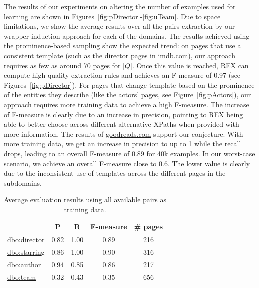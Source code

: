 \documentclass{llncs}
\begin{document}
The results of our experiments on altering the number of examples used for learning are shown in Figures~\ref{fig:pDirector}-\ref{fig:uTeam}. 
Due to space limitations, we show the average results over all the pairs extraction by our wrapper induction approach for each of the domains.
The results achieved using the prominence-based sampling show the expected trend: on pages that use a consistent template (such as the director pages in \url{imdb.com}), our approach requires as few as around 70 pages for $|Q|$. 
Once this value is reached, REX can compute high-quality extraction rules and achieves an F-measure of 0.97 (see Figures~\ref{fig:pDirector}).
For pages that change template based on the prominence of the entities they describe (like the actors' pages, see Figure~\ref{fig:pActors}), our approach requires more training data to achieve a high F-measure.
The increase of F-measure is clearly due to an increase in precision, pointing to REX being able to better choose across different alternative XPaths when provided with more information.
The results of \url{goodreads.com} support our conjecture. 
With more training data, we get an increase in precision to up to 1 while the recall drops, leading to an overall F-measure of 0.89 for 40k examples.
In our worst-case scenario, we achieve an overall F-measure close to 0.6.
The lower value is clearly due to the inconsistent use of templates across the different pages in the subdomains.

\begin{table}[htb]
\centering
\caption{Average evaluation results using all available pairs as training data.} 
\begin{tabular}{lcccc}
\toprule
  &  P & R & F-measure & \# pages \\
\midrule
\url{dbo:director}  & 0.82 & 1.00 & 0.89 & 216\\
\url{dbo:starring}  & 0.86 & 1.00 & 0.90 & 316\\
\url{dbo:author}    & 0.94 & 0.85 & 0.86 & 217\\
\url{dbo:team}      & 0.32 & 0.43 & 0.35 & 656\\
\bottomrule
\end{tabular}
\label{tab:overall}
\end{table}
\end{document}
